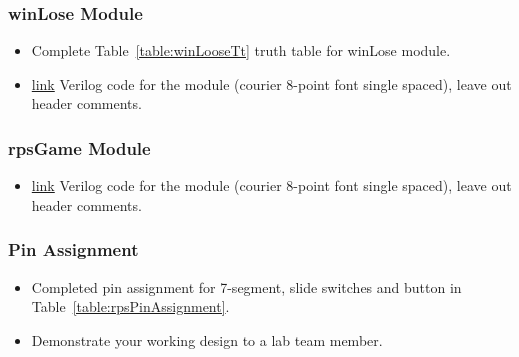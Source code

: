 \subsubsection{winLose Module}
\begin{itemize}
    \item Complete Table~\ref{table:winLooseTt} truth table for winLose module.
    \item \protect\hyperlink{winLoose_Verilog}{link} Verilog code for the module
        (courier 8-point font single spaced), leave out header comments.
\end{itemize}

\subsubsection{rpsGame Module}
\begin{itemize}
    \item \protect\hyperlink{play2Seven_Verilog}{link} Verilog code for the module
        (courier 8-point font single spaced), leave out header comments.
\end{itemize}

\subsubsection{Pin Assignment}
\begin{itemize}
    \item Completed pin assignment for 7-segment, slide switches and button in Table~\ref{table:rpsPinAssignment}.
    \item Demonstrate your working design to a lab team member.
\end{itemize}
